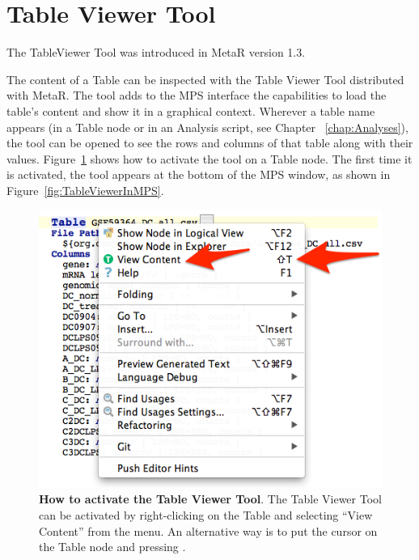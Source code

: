 \section{Table Viewer Tool}\label{sec:TableViewerTool}
\begin{remark}
The TableViewer Tool was introduced in MetaR version 1.3.
\end{remark}

The content of a Table can be inspected with the Table Viewer Tool distributed with MetaR. The tool adds to the MPS interface the capabilities to load the table's content and show it in a graphical context.
Wherever a table name appears (in a Table node or in an Analysis script, see Chapter ~\ref{chap:Analyses}), the tool can be opened to see the rows and columns of that table along with their values. Figure~\ref{fig:ActivateTableViewer} shows how to activate the tool on a Table node. The first time it is activated, the tool appears at the bottom of the MPS window, as shown in Figure~\ref{fig:TableViewerInMPS}.

\begin{figure}
  \centering
  \includegraphics[width=\figWidthNarrow]{figures/ActivateTableViewer.png}
\caption[How to activate the Table Viewer Tool]{\textbf{How to activate the Table Viewer Tool}. The Table Viewer Tool can be activated by right-clicking on the Table and selecting ``View Content'' from the menu. An alternative way is to put the cursor on the Table node and pressing .}
\label{fig:ActivateTableViewer}
\end{figure}  


